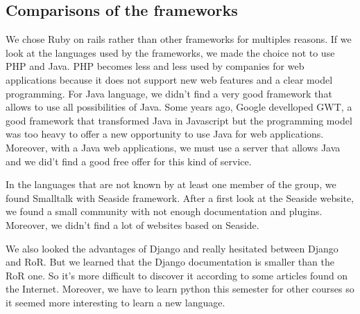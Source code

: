 \subsection{Comparisons of the frameworks}

We chose Ruby on rails rather than other frameworks for multiples reasons.  
If we look at the languages used by the frameworks, we made the choice not to use PHP 
and Java.  PHP becomes less and less used by companies for web applications because it does not support new 
web features and a clear model programming.  For Java language, we didn't find a very good framework 
that allows to use all possibilities of Java.  Some years ago, Google develloped GWT, a good framework 
that transformed Java in Javascript but the programming model was too heavy to offer a new opportunity to 
use Java for web applications.  Moreover, with a Java web applications, we must use a server that allows 
Java and we did't find a good free offer for this kind of service.

In the languages that are not known by at least one member of the group, we found Smalltalk with 
Seaside framework.  After a first look at the Seaside website, we found a small community with not 
enough documentation and plugins.  Moreover, we didn't find a lot of websites based on Seaside.

We also looked the advantages of Django and really hesitated between Django and RoR. But we learned that
the Django documentation is smaller than the RoR one. So it's more difficult to discover it according to some articles found on the Internet. Moreover, we have to learn python this semester for other 
courses so it seemed more interesting to learn a new language.

